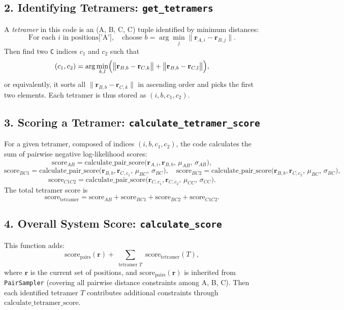 \documentclass[12pt]{article}
\begin{document}
\subsection*{2. Identifying Tetramers: \texttt{get\_tetramers}}

A \textit{tetramer} in this code is an (A, B, C, C) tuple identified by minimum distances:
\[
\text{For each } i \text{ in positions['A']}, \quad 
   \text{choose } b = \arg\min_j \bigl\|\mathbf{r}_{A,i} - \mathbf{r}_{B,j}\bigr\|.
\]
Then find two \texttt{C} indices \(c_1\) and \(c_2\) such that 
\[
(c_1,c_2) = \arg\min_{k,l} \Bigl(\bigl\|\mathbf{r}_{B,b} - \mathbf{r}_{C,k}\bigr\| + \bigl\|\mathbf{r}_{B,b} - \mathbf{r}_{C,l}\bigr\|\Bigr),
\]
or equivalently, it sorts all \(\bigl\|\mathbf{r}_{B,b} - \mathbf{r}_{C,k}\bigr\|\) in ascending order and picks the first two elements. Each tetramer is thus stored as \((i,b,c_1,c_2)\).

\subsection*{3. Scoring a Tetramer: \texttt{calculate\_tetramer\_score}}

For a given tetramer, composed of indices \((i,b,c_1,c_2)\), the code calculates the sum of pairwise negative log-likelihood scores:
\[
\text{score}_{AB} = \text{calculate\_pair\_score}\bigl(\mathbf{r}_{A,i}, \mathbf{r}_{B,b},\, \mu_{AB},\, \sigma_{AB}\bigr),
\]
\[
\text{score}_{BC1} = \text{calculate\_pair\_score}\bigl(\mathbf{r}_{B,b}, \mathbf{r}_{C,c_1},\, \mu_{BC},\, \sigma_{BC}\bigr),
\quad
\text{score}_{BC2} = \text{calculate\_pair\_score}\bigl(\mathbf{r}_{B,b}, \mathbf{r}_{C,c_2},\, \mu_{BC},\, \sigma_{BC}\bigr),
\]
\[
\text{score}_{C1C2} = \text{calculate\_pair\_score}\bigl(\mathbf{r}_{C,c_1}, \mathbf{r}_{C,c_2},\, \mu_{CC},\, \sigma_{CC}\bigr).
\]
The total tetramer score is 
\[
\text{score}_{\text{tetramer}} = \text{score}_{AB} + \text{score}_{BC1} + \text{score}_{BC2} + \text{score}_{C1C2}.
\]

\subsection*{4. Overall System Score: \texttt{calculate\_score}}

This function adds:
\[
\text{score}_{\text{pairs}}(\mathbf{r}) + \sum_{\substack{\text{tetramer } T}} \text{score}_{\text{tetramer}}(T),
\]
where \(\mathbf{r}\) is the current set of positions, and \(\text{score}_{\text{pairs}}(\mathbf{r})\) is inherited from \texttt{PairSampler} (covering all pairwise distance constraints among A, B, C). Then each identified tetramer $T$ contributes additional constraints through \(\text{calculate\_tetramer\_score}\).
\end{document}
